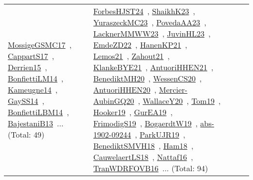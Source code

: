 {\begin{longtable}{lp{3cm}>{\raggedright\arraybackslash}p{6cm}>{\raggedright\arraybackslash}p{6cm}>{\raggedright\arraybackslash}p{8cm}}
\href{works/MossigeGSMC17.pdf}{MossigeGSMC17}~\cite{MossigeGSMC17}, \href{works/CappartS17.pdf}{CappartS17}~\cite{CappartS17}, \href{works/Derrien15.pdf}{Derrien15}~\cite{Derrien15}, \href{works/BonfiettiLM14.pdf}{BonfiettiLM14}~\cite{BonfiettiLM14}, \href{works/Kameugne14.pdf}{Kameugne14}~\cite{Kameugne14}, \href{works/GaySS14.pdf}{GaySS14}~\cite{GaySS14}, \href{works/BonfiettiLBM14.pdf}{BonfiettiLBM14}~\cite{BonfiettiLBM14}, \href{works/BajestaniB13.pdf}{BajestaniB13}~\cite{BajestaniB13}... (Total: 49) & \href{works/ForbesHJST24.pdf}{ForbesHJST24}~\cite{ForbesHJST24}, \href{works/ShaikhK23.pdf}{ShaikhK23}~\cite{ShaikhK23}, \href{works/YuraszeckMC23.pdf}{YuraszeckMC23}~\cite{YuraszeckMC23}, \href{works/PovedaAA23.pdf}{PovedaAA23}~\cite{PovedaAA23}, \href{works/LacknerMMWW23.pdf}{LacknerMMWW23}~\cite{LacknerMMWW23}, \href{works/JuvinHL23.pdf}{JuvinHL23}~\cite{JuvinHL23}, \href{works/EmdeZD22.pdf}{EmdeZD22}~\cite{EmdeZD22}, \href{works/HanenKP21.pdf}{HanenKP21}~\cite{HanenKP21}, \href{works/Lemos21.pdf}{Lemos21}~\cite{Lemos21}, \href{works/Zahout21.pdf}{Zahout21}~\cite{Zahout21}, \href{works/KlankeBYE21.pdf}{KlankeBYE21}~\cite{KlankeBYE21}, \href{works/AntuoriHHEN21.pdf}{AntuoriHHEN21}~\cite{AntuoriHHEN21}, \href{works/BenediktMH20.pdf}{BenediktMH20}~\cite{BenediktMH20}, \href{works/WessenCS20.pdf}{WessenCS20}~\cite{WessenCS20}, \href{works/AntuoriHHEN20.pdf}{AntuoriHHEN20}~\cite{AntuoriHHEN20}, \href{works/Mercier-AubinGQ20.pdf}{Mercier-AubinGQ20}~\cite{Mercier-AubinGQ20}, \href{works/WallaceY20.pdf}{WallaceY20}~\cite{WallaceY20}, \href{works/Tom19.pdf}{Tom19}~\cite{Tom19}, \href{works/Hooker19.pdf}{Hooker19}~\cite{Hooker19}, \href{works/GurEA19.pdf}{GurEA19}~\cite{GurEA19}, \href{works/FrimodigS19.pdf}{FrimodigS19}~\cite{FrimodigS19}, \href{works/BogaerdtW19.pdf}{BogaerdtW19}~\cite{BogaerdtW19}, \href{works/abs-1902-09244.pdf}{abs-1902-09244}~\cite{abs-1902-09244}, \href{works/ParkUJR19.pdf}{ParkUJR19}~\cite{ParkUJR19}, \href{works/BenediktSMVH18.pdf}{BenediktSMVH18}~\cite{BenediktSMVH18}, \href{works/Ham18.pdf}{Ham18}~\cite{Ham18}, \href{works/CauwelaertLS18.pdf}{CauwelaertLS18}~\cite{CauwelaertLS18}, \href{works/Nattaf16.pdf}{Nattaf16}~\cite{Nattaf16}, \href{works/TranWDRFOVB16.pdf}{TranWDRFOVB16}~\cite{TranWDRFOVB16}... (Total: 94)\\

\end{longtable}}
